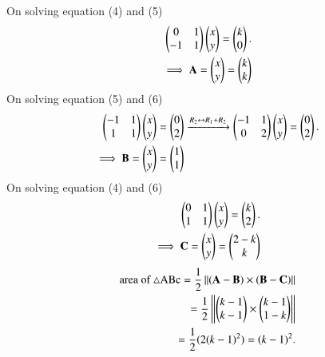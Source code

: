 \documentclass[journal]{IEEEtran}
\begin{document}
On solving equation (4) and (5)
\begin{align}
    \begin{pmatrix}
        0 & 1\\
        -1 & 1
    \end{pmatrix} \begin{pmatrix}x\\y\end{pmatrix}=\begin{pmatrix}k\\0\end{pmatrix}.\\
    \implies \mathbf{A}=\begin{pmatrix}x\\y\end{pmatrix}=\begin{pmatrix}k\\k\end{pmatrix}
\end{align}
On solving equation (5) and (6)
\begin{align}
    \begin{pmatrix}
        -1 & 1\\
        1 & 1
    \end{pmatrix} \begin{pmatrix}x\\y\end{pmatrix}=\begin{pmatrix}0\\2\end{pmatrix} &\xrightarrow{R_2 \leftrightarrow R_1+R_2} \begin{pmatrix}
        -1 & 1\\
        0 & 2
    \end{pmatrix} \begin{pmatrix}x\\y\end{pmatrix}=\begin{pmatrix}0\\2\end{pmatrix}.\\
 \implies \mathbf{B}=\begin{pmatrix}x\\y\end{pmatrix}=\begin{pmatrix}1\\1\end{pmatrix}
\end{align}
On solving equation (4) and (6)
\begin{align}
    \begin{pmatrix}
        0 & 1\\
        1 & 1
    \end{pmatrix} \begin{pmatrix}x\\y\end{pmatrix}=\begin{pmatrix}k\\2\end{pmatrix}.\\
    \implies \mathbf{C}=\begin{pmatrix}x\\y\end{pmatrix}=\begin{pmatrix}2-k\\k\end{pmatrix}
\end{align}
\begin{align}
    \text{area of }\triangle \text{ABc}=\frac{1}{2}\left\lVert(\mathbf{A}-\mathbf{B})\times(\mathbf{B}-\mathbf{C})\right\rVert\\
    =\frac{1}{2}\left\lVert\begin{pmatrix}k-1\\k-1\end{pmatrix}\times\begin{pmatrix}k-1\\1-k\end{pmatrix}\right\rVert\\
    =\frac{1}{2}(2(k-1)^2)=(k-1)^2.
\end{align}
\end{document}
